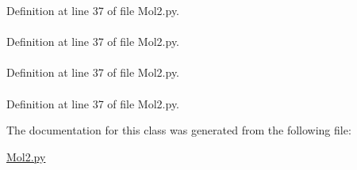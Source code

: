 \-Definition at line 37 of file \-Mol2.\-py.

\hypertarget{classforcebalance_1_1Mol2_1_1mol2__atom_a90944a47bc931c549c081131cffc20fa}{
\paragraph[{x}]{}}\label{classforcebalance_1_1Mol2_1_1mol2__atom_a90944a47bc931c549c081131cffc20fa}


\-Definition at line 37 of file \-Mol2.\-py.

\hypertarget{classforcebalance_1_1Mol2_1_1mol2__atom_ac2517b8868af803f8089d58acdfc93d7}{
\paragraph[{y}]{}}\label{classforcebalance_1_1Mol2_1_1mol2__atom_ac2517b8868af803f8089d58acdfc93d7}


\-Definition at line 37 of file \-Mol2.\-py.

\hypertarget{classforcebalance_1_1Mol2_1_1mol2__atom_ab45e46b303b3a3166c03daeead9b47c3}{
\paragraph[{z}]{}}\label{classforcebalance_1_1Mol2_1_1mol2__atom_ab45e46b303b3a3166c03daeead9b47c3}


\-Definition at line 37 of file \-Mol2.\-py.



\-The documentation for this class was generated from the following file\-:\begin{DoxyCompactItemize}
\item 
\hyperlink{Mol2_8py}{\-Mol2.\-py}\end{DoxyCompactItemize}
